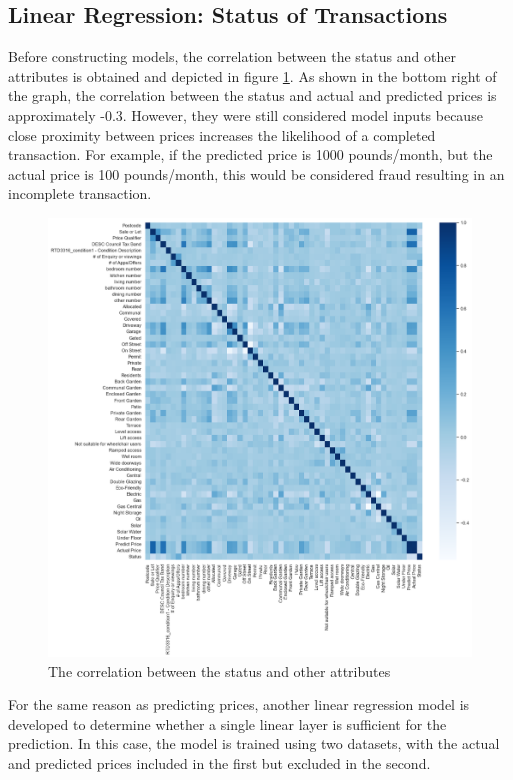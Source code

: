 \documentclass[12pt,twoside]{report}
\begin{document}
\subsection{Linear Regression: Status of Transactions}
Before constructing models, the correlation between the status and other attributes is obtained and depicted in figure \ref{correlation_status}. As shown in the bottom right of the graph, the correlation between the status and actual and predicted prices is approximately -0.3. However, they were still considered model inputs because close proximity between prices increases the likelihood of a completed transaction. For example, if the predicted price is 1000 pounds/month, but the actual price is 100 pounds/month, this would be considered fraud resulting in an incomplete transaction. 

\begin{figure}[!htbp]
	\centering
	\includegraphics[width=15cm]{correlation_status}
	\caption{The correlation between the status and other attributes}
	\label{correlation_status}
\end{figure}

For the same reason as predicting prices, another linear regression model is developed to determine whether a single linear layer is sufficient for the prediction. In this case, the model is trained using two datasets, with the actual and predicted prices included in the first but excluded in the second. 
\end{document}
